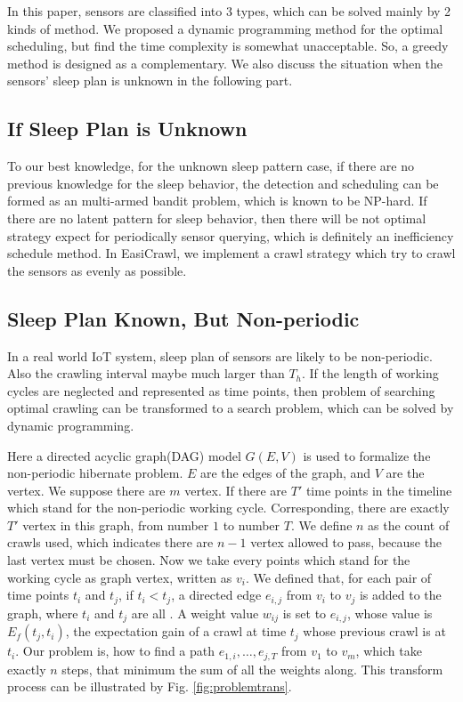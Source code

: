 \documentclass[conference]{IEEEtran}
\begin{document}
In this paper, sensors are classified into 3 types, which can be solved mainly by 2 kinds of method. We proposed a dynamic programming method for the optimal scheduling, but find the time complexity is somewhat unacceptable. So, a greedy method is designed as a complementary. We also discuss the situation when the sensors' sleep plan is unknown in the following part.

\subsection{If Sleep Plan is Unknown}
To our best knowledge, for the unknown sleep pattern case, if there are no previous knowledge for the sleep behavior, the detection and scheduling can be formed as an multi-armed bandit problem, which is known to be NP-hard. If there are no latent pattern for sleep behavior, then there will be not optimal strategy expect for periodically sensor querying, which is definitely an inefficiency schedule method. In EasiCrawl, we implement a crawl strategy which try to crawl the sensors as evenly as possible.


\subsection{Sleep Plan Known, But Non-periodic}
In a real world IoT system, sleep plan of sensors are likely to be non-periodic. Also the crawling interval maybe much larger than $T_h$. 
If the length of working cycles are neglected and represented as time points, then problem of searching optimal crawling can be transformed to a search problem, which can be solved by dynamic programming.


Here a directed acyclic graph(DAG) model $G(E,V)$ is used to formalize the non-periodic hibernate problem.
$E$ are the edges of the graph, and $V$ are the vertex. We suppose there are $m$ vertex. 
If there are $T'$ time points in the timeline which stand for the non-periodic working cycle. Corresponding, there are exactly $T'$ vertex in this graph, from number $1$ to number $T$. 
We define $n$ as the count of crawls used, which indicates there are $n-1$ vertex allowed to pass, because the last vertex must be chosen. 
Now we take every points which stand for the working cycle as graph vertex, written as $v_i$. We defined that, for each pair of time points $t_i$ and $t_j$, if $t_i<t_j$, a directed edge $e_{i,j}$ from $v_i$ to $v_j$ is added to the graph, where $t_i$ and $t_j$ are all . A weight value $w_{ij}$ is set to $e_{i,j}$, whose value is $E_f(t_j, t_i)$, the expectation gain of a crawl at time $t_j$ whose previous crawl is at $t_i$.
Our problem is, how to find a path $e_{1,i},\ldots,e_{j,T}$ from $v_1$ to $v_m$, which take exactly $n$ steps, that minimum the sum of all the weights along. This transform process can be illustrated by Fig. \ref{fig:problemtrans}.
\end{document}
